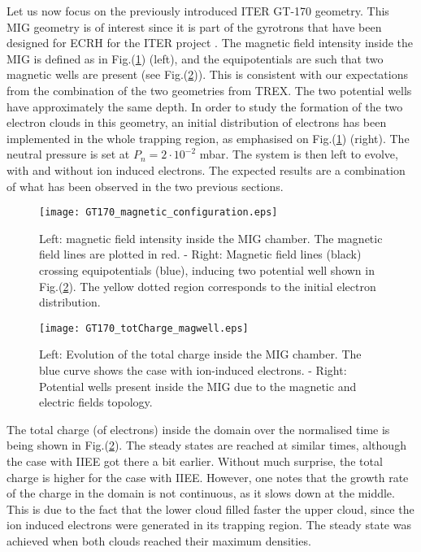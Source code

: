 Let us now focus on the previously introduced ITER GT-170 geometry. This MIG geometry is of interest since it is part of the gyrotrons that have been designed for ECRH for the ITER project \cite{gyrotrons_iter}. The magnetic field intensity inside the MIG is defined as in Fig.(\ref{magnetic_configuration}) (left), and the equipotentials are such that two magnetic wells are present (see Fig.(\ref{Totcharge+magwell})). This is consistent with our expectations from the combination of the two geometries from TREX. The two potential wells have approximately the same depth. In order to study the formation of the two electron clouds in this geometry, an initial distribution of electrons has been implemented in the whole trapping region, as emphasised on Fig.(\ref{magnetic_configuration}) (right). The neutral pressure is set at $P_n=2\cdot 10^{-2}$ mbar. The system is then left to evolve, with and without ion induced electrons. The expected results are a combination of what has been observed in the two previous sections.\\

\begin{figure}[h!]
\centering
	\texttt{[image: GT170\_magnetic\_configuration.eps]}
	\caption{\label{magnetic_configuration} Left: magnetic field intensity inside the MIG chamber. The magnetic field lines are plotted in red. -  Right: Magnetic field lines (black) crossing equipotentials (blue), inducing two potential well shown in Fig.(\ref{Totcharge+magwell}). The yellow dotted region corresponds to the initial electron distribution.}
\end{figure}


\begin{figure}[h!]
\centering
	\texttt{[image: GT170\_totCharge\_magwell.eps]}
	\caption{\label{Totcharge+magwell} Left: Evolution of the total charge inside the MIG chamber. The blue curve shows the case with ion-induced electrons. - Right: Potential wells present inside the MIG due to the magnetic and electric fields topology.}
\end{figure}


The total charge (of electrons) inside the domain over the normalised time is being shown in Fig.(\ref{Totcharge+magwell}). The steady states are reached at similar times, although the case with IIEE got there a bit earlier. Without much surprise, the total charge is higher for the case with IIEE. However, one notes that the growth rate of the charge in the domain is not continuous, as it slows down at the middle. This is due to the fact that the lower cloud filled faster the upper cloud, since the ion induced electrons were generated in its trapping region. The steady state was achieved when both clouds  reached their maximum densities. \\


